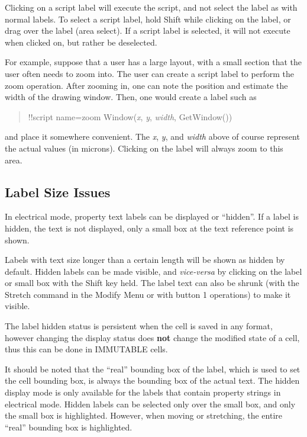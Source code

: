 Clicking on a script label will execute the script, and not select the
label as with normal labels.  To select a script label, hold {\kb
Shift} while clicking on the label, or drag over the label (area
select).  If a script label is selected, it will not execute when
clicked on, but rather be deselected.

For example, suppose that a user has a large layout, with a small
section that the user often needs to zoom into.  The user can create a
script label to perform the zoom operation.  After zooming in, one can
note the position and estimate the width of the drawing window.  Then,
one would create a label such as
\begin{quote} \vt
  !!script name=zoom Window({\it x\/}, {\it y\/}, {\it width\/}, GetWindow())
\end{quote}
and place it somewhere convenient.  The {\it x\/}, {\it y\/}, and {\it
width} above of course represent the actual values (in microns). 
Clicking on the label will always zoom to this area.

\subsection{Label Size Issues}
\label{labelsize}

In electrical mode, property text labels can be displayed or
``hidden''.  If a label is hidden, the text is not displayed, only a
small box at the text reference point is shown.

Labels with text size longer than a certain length will be shown as
hidden by default.  Hidden labels can be made visible, and {\it
vice-versa} by clicking on the label or small box with the {\kb Shift}
key held.  The label text can also be shrunk (with the {\cb Stretch}
command in the {\cb Modify Menu} or with button 1 operations) to make
it visible.

The label hidden status is persistent when the cell is saved in any
format, however changing the display status does {\bf not} change the
modified state of a cell, thus this can be done in IMMUTABLE cells.

It should be noted that the ``real'' bounding box of the label, which
is used to set the cell bounding box, is always the bounding box of
the actual text.  The hidden display mode is only available for the
labels that contain property strings in electrical mode.  Hidden
labels can be selected only over the small box, and only the small box
is highlighted.  However, when moving or stretching, the entire
``real'' bounding box is highlighted.

